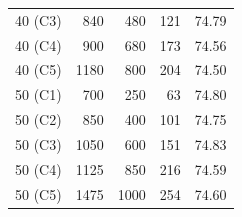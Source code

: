 \begin{table}[t]
\begin{tabular}{rrrrr}
40 (C3) & 840 & 480 & 121 & 74.79 \\
40 (C4) & 900 & 680 & 173 & 74.56 \\
40 (C5) & 1180 & 800 & 204 & 74.50 \\
\midrule
50 (C1) & 700 & 250 & 63 & 74.80 \\
50 (C2) & 850 & 400 & 101 & 74.75 \\
50 (C3) & 1050 & 600 & 151 & 74.83 \\
50 (C4) & 1125 & 850 & 216 & 74.59 \\
50 (C5) & 1475 & 1000 & 254 & 74.60 \\
\bottomrule
\end{tabular}
\end{table}

